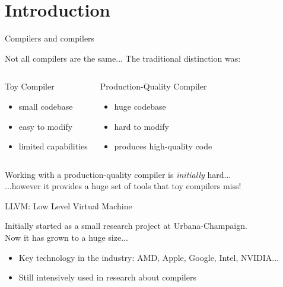
\section{Introduction}


\begin{frame}{Compilers and compilers}
\begin{center}
Not all compilers are the same... The traditional distinction was:

\begin{columns}[t]

\begin{block}{Toy Compiler}
\begin{itemize}
\item small codebase
\item easy to modify
\item limited capabilities
\end{itemize}
\end{block}

\begin{block}{Production-Quality Compiler}
\begin{itemize}
\item huge codebase
\item hard to modify
\item produces high-quality code
\end{itemize}
\end{block}

\end{columns}
\bigskip
Working with a production-quality compiler is \emph{initially} \alert{hard}...\\
\medskip
...however it provides a huge set of tools that toy compilers \alert{miss}!
\end{center}
\end{frame}


\begin{frame}{LLVM: Low Level Virtual Machine}
\begin{center}
Initially started as a small research project at Urbana-Champaign.\\
\medskip
Now it has grown to a huge size...
\end{center}

\begin{itemize}
\item Key technology in the \alert{industry}: AMD, Apple, Google, Intel, NVIDIA...
\item Still intensively used in \alert{research} about compilers
\end{itemize}
\end{frame}


